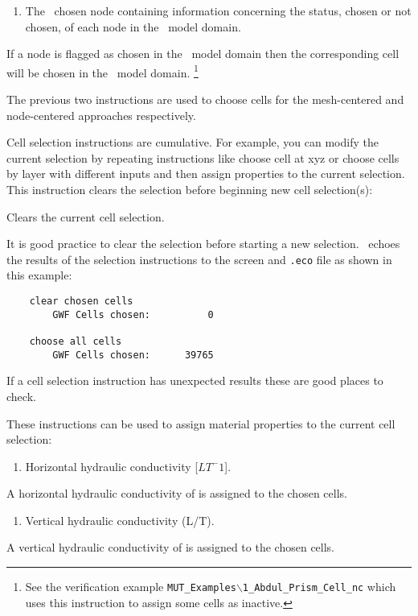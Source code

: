     {
        \squish
        \begin{enumerate}
        \item {}  The \gb\ chosen node  containing information concerning the status, chosen or not chosen, of each node in the \gb\ model domain.
        \end{enumerate}
          If a node is flagged as chosen in the \gb\ model domain then the corresponding cell will be chosen in the \mfus\ model domain.  \footnote{ See the verification example \texttt{MUT\_Examples$\backslash$1\_Abdul\_Prism\_Cell\_nc} which uses this instruction to assign some cells as inactive.}
    }

The previous two instructions are used to choose cells for the mesh-centered and node-centered approaches respectively.

Cell selection instructions are cumulative.  For example, you can modify the current selection by repeating instructions like  \textsf{choose cell at xyz} or \textsf{choose cells by layer} with different inputs and then assign properties to the current selection.  This instruction clears the selection before beginning new cell selection(s):

    {Clears the current cell selection.
     }

It is good practice to clear the selection before starting a new selection. \mut\ echoes the results of the selection instructions to the screen and \texttt{.eco} file as shown in this example:
\begin{verbatim}
    clear chosen cells
    	GWF Cells chosen:          0

    choose all cells
    	GWF Cells chosen:      39765
\end{verbatim}
If a cell selection instruction has unexpected results these are good places to check.

\pagebreak
These instructions can be used to assign material properties to the current cell selection:

    {
        \squish
        \begin{enumerate}
        \item {}  Horizontal hydraulic conductivity [$L T^-1$].
        \end{enumerate}
          A horizontal hydraulic conductivity of  is assigned to the chosen cells.
    }


    {
        \squish
        \begin{enumerate}
        \item {}  Vertical hydraulic conductivity (L/T).
        \end{enumerate}
          A vertical hydraulic conductivity of  is assigned to the chosen cells.
    }

